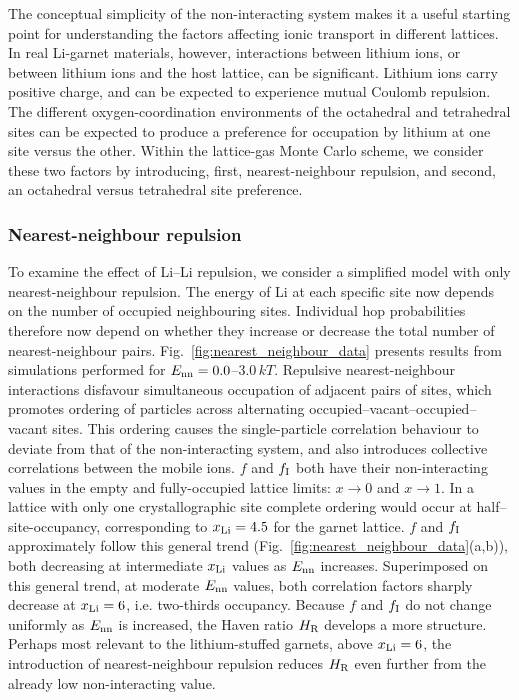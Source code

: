 \documentclass[aps,prb,twocolumn,superscriptaddress,reprint]{revtex4-1}
\newcommand{\xLi}{x_\m{Li}}
\begin{document}
The conceptual simplicity of the non-interacting system makes it a useful starting point for understanding the factors affecting ionic transport in different lattices. 
In real Li-garnet materials, however, interactions between lithium ions, or between lithium ions and the host lattice, can be significant. 
Lithium ions carry positive charge, and can be expected to experience mutual Coulomb repulsion. The different oxygen-coordination environments of the octahedral and tetrahedral sites can be expected to produce a preference for occupation by lithium at one site versus the other.\cite{WangEtAl_NatMater2015} 
Within the lattice-gas Monte Carlo scheme, we consider these two factors by introducing, first, nearest-neighbour repulsion, and second, an octahedral versus tetrahedral site preference.

\subsubsection{Nearest-neighbour repulsion}

To examine the effect of Li--Li repulsion, we consider a simplified model with only nearest-neighbour repulsion. 
The energy of Li at each specific site now depends on the number of occupied neighbouring sites. Individual hop probabilities therefore now depend on whether they increase or decrease the total number of nearest-neighbour pairs. 
Fig.~\ref{fig:nearest_neighbour_data} presents results from simulations performed for $E_{\mathrm{nn}}=0.0$--$3.0\,kT$. 
Repulsive nearest-neighbour interactions disfavour simultaneous occupation of adjacent pairs of sites, which promotes ordering of particles across alternating  occupied--vacant--occupied--vacant sites.
This ordering causes the single-particle correlation behaviour to deviate from that of the non-interacting system, and also introduces collective correlations between the mobile ions.\cite{Murch_SolStatIonics1982} $f$ and $f_{\mathrm{I}}$ both have their non-interacting values in the empty and fully-occupied lattice limits: $x\to0$ and $x\to1$. In a lattice with only one crystallographic site complete ordering would occur at half--site-occupancy, corresponding to $\xLi=4.5$ for the garnet lattice. $f$ and $f_{\mathrm{I}}$ approximately follow this general trend (Fig.~\ref{fig:nearest_neighbour_data}(a,b)), both decreasing at intermediate $\xLi$ values as $E_{\mathrm{nn}}$ increases. Superimposed on this general trend, at moderate $E_{\mathrm{nn}}$ values, both correlation factors sharply decrease at $\xLi=6$, i.e. two-thirds occupancy. Because $f$ and $f_{\mathrm{I}}$ do not change uniformly as $E_{\mathrm{nn}}$ is increased, the Haven ratio $H_{\mathrm{R}}$ develops a more structure. Perhaps most relevant to the lithium-stuffed garnets, above $\xLi=6$, the introduction of nearest-neighbour repulsion reduces $H_{\mathrm{R}}$ even further from the already low non-interacting value.
\end{document}
